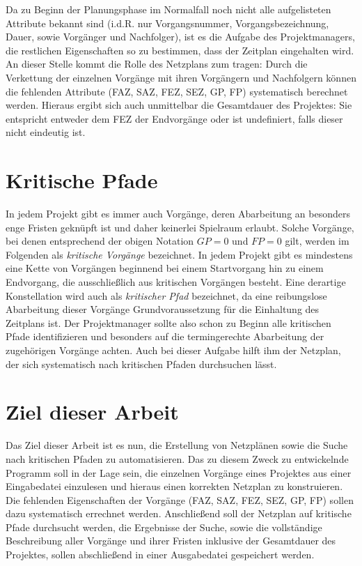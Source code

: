 Da zu Beginn der Planungsphase im Normalfall noch nicht alle aufgelisteten
Attribute bekannt sind (i.d.R. nur Vorgangsnummer,
Vorgangsbezeichnung, Dauer, sowie Vorg\"anger und Nachfolger),
ist es die Aufgabe des Projektmanagers, die restlichen Eigenschaften
so zu bestimmen, dass der Zeitplan eingehalten
wird. An dieser Stelle kommt die Rolle des Netzplans zum tragen: Durch
die Verkettung der einzelnen Vorg\"ange mit ihren Vorg\"angern und
Nachfolgern k\"onnen die fehlenden Attribute (FAZ, SAZ, FEZ, SEZ, GP,
FP) systematisch berechnet werden. Hieraus ergibt sich auch
unmittelbar die Gesamtdauer des Projektes: Sie entspricht entweder dem
FEZ der Endvorg\"ange oder ist undefiniert, falls dieser nicht
eindeutig ist.

\section{Kritische Pfade}

In jedem Projekt gibt es immer auch Vorg\"ange, deren Abarbeitung an
besonders enge Fristen gekn\"upft ist und daher keinerlei Spielraum
erlaubt. Solche Vorg\"ange, bei denen entsprechend der obigen Notation
\(GP=0\) und \(FP=0\) gilt, werden im Folgenden als \textit{kritische
  Vorg\"ange} bezeichnet.
In jedem Projekt gibt es mindestens eine Kette von Vorg\"angen
beginnend bei einem Startvorgang hin zu einem Endvorgang, die
ausschlie{\ss}lich aus kritischen Vorg\"angen besteht. Eine derartige
Konstellation wird auch als \textit{kritischer Pfad} bezeichnet, da
eine reibungslose Abarbeitung dieser Vorg\"ange Grundvoraussetzung
f\"ur die Einhaltung des Zeitplans ist. Der Projektmanager sollte also
schon zu Beginn alle kritischen Pfade identifizieren und besonders auf
die termingerechte Abarbeitung der zugeh\"origen Vorg\"ange
achten. Auch bei dieser Aufgabe hilft ihm der Netzplan, der sich
systematisch nach kritischen Pfaden durchsuchen l\"asst.

\section{Ziel dieser Arbeit}

Das Ziel dieser Arbeit ist es nun, die Erstellung von Netzpl\"anen
sowie die Suche nach kritischen Pfaden zu automatisieren.
Das zu diesem Zweck zu entwickelnde Programm soll in der Lage sein, die
einzelnen Vorg\"ange eines Projektes aus einer Eingabedatei einzulesen
und hieraus einen korrekten Netzplan zu konstruieren. Die fehlenden
Eigenschaften der Vorg\"ange (FAZ, SAZ, FEZ, SEZ, GP, FP) sollen dazu
systematisch errechnet werden. Anschlie{\ss}end soll der Netzplan auf
kritische Pfade durchsucht werden, die Ergebnisse der Suche, sowie die
vollst\"andige Beschreibung aller Vorg\"ange und ihrer Fristen
inklusive der Gesamtdauer des Projektes, sollen
abschlie{\ss}end in einer Ausgabedatei gespeichert werden.
